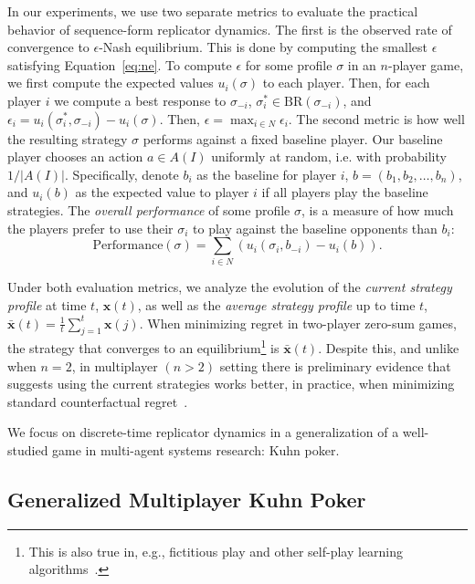 \documentclass{aamas2014}
\newcommand{\bx}{\mathbf{x}}
\newcommand{\BR}{\mbox{BR}}
\begin{document}
In our experiments, we use two separate metrics to evaluate the practical behavior of sequence-form replicator dynamics. 
The first is the observed rate of convergence to $\epsilon$-Nash equilibrium. This is done by computing the smallest 
$\epsilon$ satisfying Equation~\ref{eq:ne}. To compute $\epsilon$ for some profile $\sigma$ in an $n$-player game, we first
compute the expected values $u_i(\sigma)$ to each player. 
Then, for each player $i$ we compute a best response to $\sigma_{-i}$, $\sigma^*_i \in \BR(\sigma_{-i})$, and 
$\epsilon_i = u_i(\sigma^*_i, \sigma_{-i}) - u_i(\sigma)$. Then, $\epsilon = \max_{i \in N} \epsilon_i$. 
The second metric is how well the resulting strategy $\sigma$ performs against a fixed baseline player. Our baseline player 
chooses an action $a \in A(I)$ uniformly at random, i.e. with probability $1/|A(I)|$. Specifically, denote 
$b_i$ as the baseline for player $i$, $b = (b_1, b_2, \ldots, b_n)$, and $u_i(b)$ as the expected value to player $i$
if all players play the baseline strategies. The {\it overall performance} of some profile $\sigma$,  is a measure of how 
much the players prefer to use their $\sigma_i$ to play against the baseline opponents than $b_i$:
\begin{equation}
\mbox{Performance}(\sigma) = \sum_{i \in N} \left( u_i(\sigma_i, b_{-i}) - u_i(b) \right).
\end{equation}

Under both evaluation metrics, we analyze the evolution of the {\it current strategy profile} at time $t$, $\bx(t)$, as well 
as the {\it average strategy profile} up to time $t$, $\bar{\bx}(t) = \frac{1}{t}\sum_{j=1}^t \bx(j)$. When minimizing regret in 
two-player zero-sum games, the strategy that converges to an equilibrium\footnote{This is also true in, e.g., fictitious play and other self-play learning algorithms~\cite{FudLev98}.} 
is $\bar{\bx}(t)$. 
Despite this, and unlike when $n = 2$, 
in multiplayer $(n > 2)$ setting there is preliminary evidence that suggests using the current strategies 
works better, in practice, when minimizing standard counterfactual regret~\cite{Gibson13domination}. 

We focus on discrete-time replicator dynamics in a generalization of a well-studied game in multi-agent systems research: Kuhn poker. 

\subsection{Generalized Multiplayer Kuhn Poker}
\end{document}
